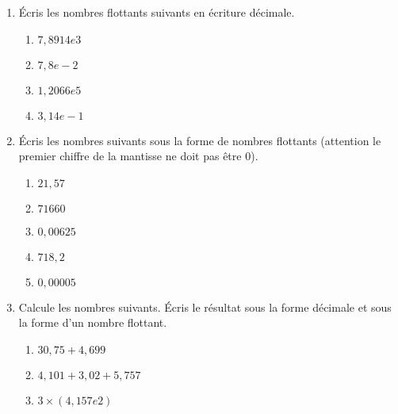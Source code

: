 \documentclass[class=report,crop=false,12pt]{standalone}
\begin{document}
\begin{activite}
\begin{itemize}
\end{itemize}


\begin{enumerate}
  \item Écris les nombres flottants suivants en écriture décimale.
  \begin{enumerate}
    \item $7,8914e3$
    \item $7,8e-2$
    \item $1,2066e5$
    \item $3,14e-1$
  \end{enumerate}
  
  \item Écris les nombres suivants sous la forme de nombres flottants (attention le premier chiffre de la mantisse ne doit pas être $0$).
  \begin{enumerate}
    \item $21,57$
    \item $71660$
    \item $0,00625$
    \item $718,2$
    \item $0,00005$  
  \end{enumerate}

  \item Calcule les nombres suivants. Écris le résultat sous la forme décimale et sous la forme d'un nombre flottant.
  \begin{enumerate}
    \item $30,75 + 4,699$
    \item $4,101 + 3,02 + 5,757$
    \item $3 \times (4,157e2)$
  \end{enumerate}
  
 \end{enumerate} 
  
\end{activite}
\end{document}
